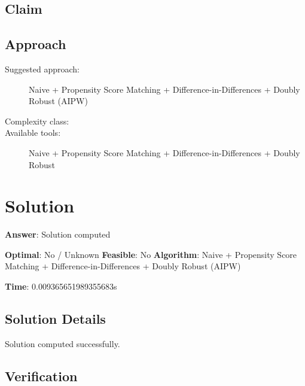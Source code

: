 \documentclass[11pt, a4paper]{article}
\begin{document}
\subsection{Claim}


\subsection{Approach}

\begin{description}
  \item[Suggested approach:] Naive + Propensity Score Matching + Difference-in-Differences + Doubly Robust (AIPW)
  \item[Complexity class:] 
  \item[Available tools:] Naive + Propensity Score Matching + Difference-in-Differences + Doubly Robust
\end{description}
\section{Solution}

\begin{polyaresult}

\textbf{Answer}: Solution computed


\textbf{Optimal}: No / Unknown \hfill
\textbf{Feasible}: No
\textbf{Algorithm}: Naive + Propensity Score Matching + Difference-in-Differences + Doubly Robust (AIPW) \quad $$

\textbf{Time}: 0.009365651989355683s


\end{polyaresult}

\subsection{Solution Details}

Solution computed successfully.

\subsection{Verification}
\end{document}
